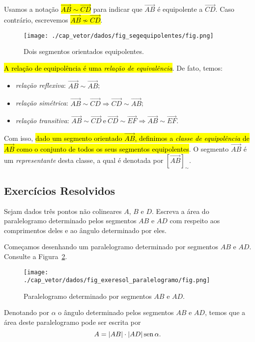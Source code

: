 Usamos a notação \hl{$\overrightarrow{AB} \sim \overrightarrow{CD}$} para indicar que $\overrightarrow{AB}$ é equipolente a $\overrightarrow{CD}$. Caso contrário, escrevemos \hl{$\overrightarrow{AB} \not\sim \overrightarrow{CD}$}.

\begin{figure}[h]
  \centering
  \texttt{[image: ./cap\_vetor/dados/fig\_segequipolentes/fig.png]}
  \caption{Dois segmentos orientados equipolentes.}
  \label{cap_vetor_sec_segorien:fig:segequipolentes}
\end{figure}

\hl{A relação de equipolência é uma \emph{relação de equivalência}}. De fato, temos:
\begin{itemize}
\item \emph{relação reflexiva}: $\overrightarrow{AB} \sim \overrightarrow{AB}$;
\item \emph{relação simétrica}: $\overrightarrow{AB} \sim \overrightarrow{CD} \Rightarrow \overrightarrow{CD} \sim \overrightarrow{AB}$;
\item \emph{relação transitiva}: $\overrightarrow{AB} \sim \overrightarrow{CD} ~ \text{e} ~ \overrightarrow{CD} \sim \overrightarrow{EF} \Rightarrow \overrightarrow{AB} \sim \overrightarrow{EF}$.
\end{itemize}

Com isso, \hl{dado um segmento orientado $\overrightarrow{AB}$, definimos a \emph{classe de equipolência} de $\overrightarrow{AB}$ como o conjunto de todos os seus segmentos equipolentes}. O segmento $\overrightarrow{AB}$ é um \emph{representante} desta classe, a qual é denotada por $\left[\overrightarrow{AB}\right]_{\sim}$.

\subsection{Exercícios Resolvidos}

\begin{exeresol}
  Sejam dados três pontos não colineares $A$, $B$ e $D$. Escreva a área do paralelogramo determinado pelos segmentos $AB$ e $AD$ com respeito aos comprimentos deles e ao ângulo determinado por eles.
\end{exeresol}
\begin{resol}
  Começamos desenhando um paralelogramo determinado por segmentos $AB$ e $AD$. Consulte a Figura~\ref{cap_vetor_sec_segorien:fig:exeresol_paralelogramo}.

  \begin{figure}[H]
    \centering
    \texttt{[image: ./cap\_vetor/dados/fig\_exeresol\_paralelogramo/fig.png]}
    \caption{Paralelogramo determinado por segmentos $AB$ e $AD$.}
    \label{cap_vetor_sec_segorien:fig:exeresol_paralelogramo}
  \end{figure}

  Denotando por $\alpha$ o ângulo determinado pelos segmentos $AB$ e $AD$, temos que a área deste paralelogramo pode ser escrita por
  \begin{equation}
    A = |AB|\cdot |AD| \operatorname{sen} \alpha.
  \end{equation}
\end{resol}

